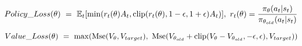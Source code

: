 $$Policy\_Loss(\theta) \ = \ \mathbb{E}_t[\min(r_t(\theta)A_t, {\rm clip}(r_t(\theta), 1 - \epsilon, 1 + \epsilon)A_t)], \ r_t(\theta) = \frac{\pi_{\theta}(a_t|s_t)}{\pi_{\theta_{old}}(a_t|s_t)}$$

$$Value\_Loss(\theta) \ = \ \max({\rm Mse}(V_{\theta}, V_{target}), \ {\rm Mse}(V_{\theta_{old}} + {\rm clip}(V_{\theta} - V_{\theta_{old}}, -\epsilon, \epsilon), V_{target}))$$


